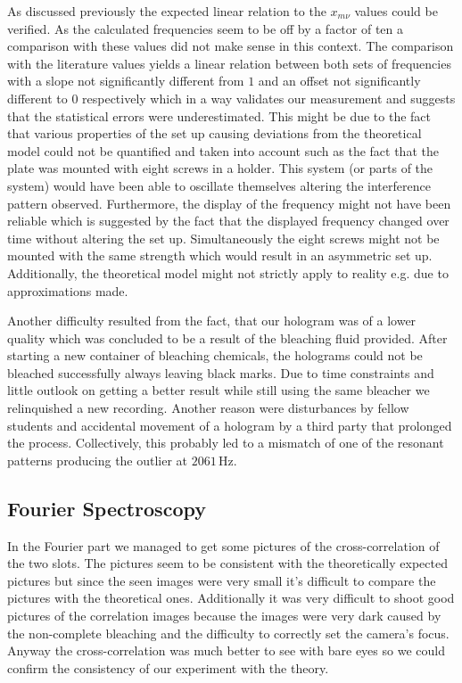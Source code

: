 As discussed previously the expected linear relation to the $x_{m\nu}$ values could be verified. As the calculated frequencies seem to be off by a factor of ten a comparison with these values did not make sense in this context. The comparison with the literature values yields a linear relation between both sets of frequencies with a slope not significantly different from $1$ and an offset not significantly different to $0$ respectively which in a way validates our measurement and suggests that the statistical errors were underestimated. This might be due to the fact that various properties of the set up causing deviations from the theoretical model could not be quantified and taken into account such as the fact that the plate was mounted with eight screws in a holder. This system (or parts of the system) would have been able to oscillate themselves altering the interference pattern observed. Furthermore, the display of the frequency might not have been reliable which is suggested by the fact that the displayed frequency changed over time without altering the set up. Simultaneously the eight screws might not be mounted with the same strength which would result in an asymmetric set up. Additionally, the theoretical model might not strictly apply to reality e.g. due to approximations made.

Another difficulty resulted from the fact, that our hologram was of a lower quality which was concluded to be a result of the bleaching fluid provided. After starting a new container of bleaching chemicals, the holograms could not be bleached successfully always leaving black marks. Due to time constraints and little outlook on getting a better result while still using the same bleacher we relinquished a new recording. Another reason were disturbances by fellow students and accidental movement of a hologram by a third party that prolonged the process. Collectively, this probably led to a mismatch of one of the resonant patterns producing the outlier at $2061\,\mathrm{Hz}$.


\subsection{Fourier Spectroscopy}
In the Fourier part we managed to get some pictures of the cross-correlation of the two slots. The pictures seem to be consistent with the theoretically expected pictures but since the seen images were very small it's difficult to compare the pictures with the theoretical ones. Additionally it was very difficult to shoot good pictures of the correlation images because the images were very dark caused by the non-complete bleaching and the difficulty to correctly set the camera's focus. Anyway the cross-correlation was much better to see with bare eyes so we could confirm the consistency of our experiment with the theory.